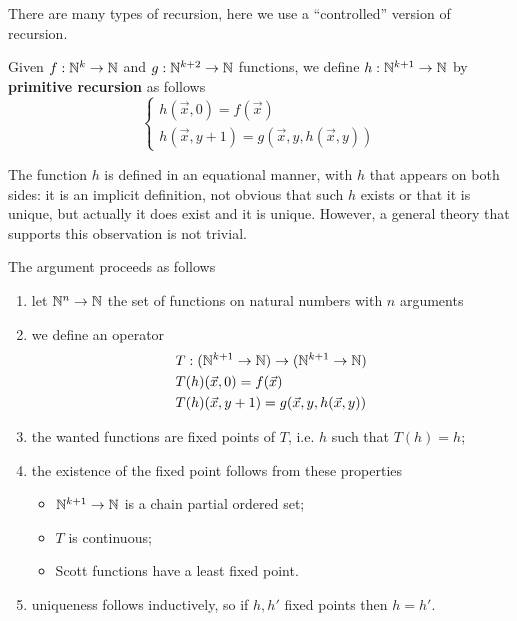 There are many types of recursion, here we use a ``controlled'' version of recursion.
\begin{definition}
  Given $f:\mathbb{N}^k\rightarrow\mathbb{N}$ and $g:\mathbb{N}^{k+2}\rightarrow\mathbb{N}$ functions,
we define $h:\mathbb{N}^{k+1}\rightarrow\mathbb{N}$ by \textbf{primitive recursion} as follows
\begin{equation*}
  \begin{cases}
    h(\vec{x},0) = f(\vec{x})\\
    h(\vec{x}, y+1) = g(\vec{x},y,h(\vec{x},y))
  \end{cases}
\end{equation*}
\end{definition}

\begin{remark}
  The function $h$ is defined in an equational manner, with $h$ that appears on both sides: 
  it is an implicit definition, not obvious that such $h$ exists or that it is unique, 
  but actually it does exist and it is unique. However, a general theory that supports this observation is not trivial.

  The argument proceeds as follows

\begin{enumerate}
\item let $\mathbb{N}^n\rightarrow\mathbb{N}$ the set of functions on natural numbers with $n$ arguments
\item we define an operator
  \begin{align*}
    &T: (\mathbb{N}^{k+1}\rightarrow\mathbb{N}) \rightarrow (\mathbb{N}^{k+1}\rightarrow\mathbb{N})\\
    &T(h)(\vec{x},0) = f(\vec{x})\\
    &T(h)(\vec{x},y+1) = g(\vec{x},y,h(\vec{x},y))
  \end{align*}
\item the wanted functions are fixed points of $T$, i.e. $h$ such that $T(h) = h$;
\item the existence of the fixed point follows from these properties
  \begin{itemize}
  \item $\mathbb{N}^{k+1}\rightarrow\mathbb{N}$ is a chain partial ordered set;
  \item $T$ is continuous;
  \item Scott functions have a least fixed point.
  \end{itemize}
\item uniqueness follows inductively, so if $h,h'$ fixed points then $h=h'$.
\end{enumerate}
\end{remark}

